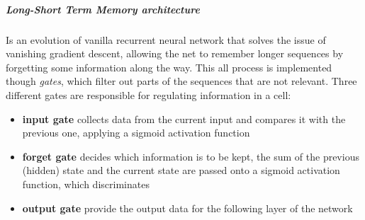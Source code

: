 \documentclass[12pt]{article}
\begin{document}
  \subparagraph{\hfill \Large Long-Short Term Memory architecture}
  Is an evolution of vanilla recurrent neural network that solves the issue of vanishing gradient descent, allowing the net to remember longer sequences by forgetting some information along the way. This all process is implemented though \textit{gates}, which filter out parts of the sequences that are not relevant. Three different gates are responsible for regulating information in a cell:
  \begin{itemize}
    \item \textbf{input gate} collects data from the current input and compares it with the previous one, applying a sigmoid activation function
    \item \textbf{forget gate} decides which information is to be kept, the sum of the previous (hidden) state and the current state are passed onto a sigmoid activation function, which discriminates
    \item \textbf{output gate} provide the output data for the following layer of the network
  \end{itemize}
\end{document}
